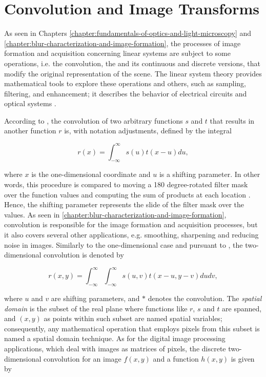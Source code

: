 \section{Convolution and Image Transforms}

As seen in Chapters \ref{chapter:fundamentals-of-optics-and-light-microscopy} and \ref{chapter:blur-characterization-and-image-formation}, the processes of image formation and acquisition concerning linear systems are subject to some operations, i.e. the convolution, the  and its continuous and discrete versions, that modify the original representation of the scene. The linear system theory provides mathematical tools to explore these operations and others, such as sampling, filtering, and enhancement; it describes the behavior of electrical circuits and optical systems \cite{castleman1996digital}.

According to , the convolution of two arbitrary functions $s$ and $t$ that results in another function $r$ is, with notation adjustments, defined by the integral

\begin{equation}
\label{eqn:one_dimensional_convolution}
r(x) = \int_{-\infty}^{\infty}s(u) t(x - u) du,
\end{equation}

\noindent where $x$ is the one-dimensional coordinate and $u$ is a shifting parameter. In other words, this procedure is compared to moving a 180 degree-rotated filter mask over the function values and computing the sum of products at each location \cite{gonzalez2018digital}. Hence, the shifting parameter represents the slide of the filter mask over the values. As seen in \autoref{chapter:blur-characterization-and-image-formation}, convolution is responsible for the image formation and acquisition processes, but it also covers several other applications, e.g. smoothing, sharpening and reducing noise in images. Similarly to the one-dimensional case and pursuant to , the two-dimensional convolution is denoted by

\begin{equation}
\label{eqn:two_dimensional_convolution}
r(x,y) = \int_{-\infty}^{\infty}
         \int_{-\infty}^{\infty}
         s(u,v) t(x - u, y - v) du dv,
\end{equation}

\noindent where $u$ and $v$ are shifting parameters, and $\ast$ denotes the convolution. The \emph{spatial domain} is the subset of the real plane where functions like $r$, $s$ and $t$ are spanned, and $(x,y)$ as points within such subset are named spatial variables; consequently, any mathematical operation that employs pixels from this subset is named a spatial domain technique. As for the digital image processing applications, which deal with images as matrices of pixels, the discrete two-dimensional convolution for an image $f(x,y)$ and a function $h(x,y)$ is given by 

